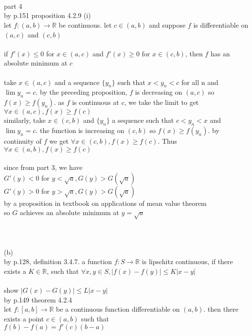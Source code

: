 \documentclass[12pt, border = 4pt, multi]{article} %
\begin{document}
\\
\\
\\
part 4\\
by p.151 proposition 4.2.9 (i)\\
let $f: (a, b) \rightarrow \mathbb{R}$ be continuous. let $c \in (a, b)$ and suppose $f$ is differentiable on $(a, c)$ and $(c, b)$\\
\\
if $f'(x) \leq 0$ for $x \in (a, c)$ and $f'(x) \geq 0$ for $x \in (c,b)$, then $f$ has an absolute minimum at $c$\\
\\
take $x \in (a, c)$ and a sequence
$\{y_n\}$ such that $x < y_n < c$ for all n and $\lim y_n = c$. by the preceding proposition, $f$ is decreasing on
$(a, c)$ so $f(x) \geq f(y_n)$. as $f$ is continuous at $c$, we take the limit to get $\forall x \in (a, c), f(x) \geq f(c)$\\
similarly, take $x \in (c, b)$ and $\{y_n\}$ a sequence such that $c < y_n < x$ and $\lim y_n = c$. the function
is increasing on $(c, b)$ so $f(x) \geq f(y_n)$. by continuity of $f$ we get $ \forall x \in (c, b), f(x) \geq f(c)$.
Thus $\forall x \in (a,b), f(x) \geq f(c)$\\
\\
since from part 3, we have\\
$G'(y) < 0$ for $y < \sqrt{a}, G(y) > G(\sqrt{a})$\\
$G'(y) > 0$ for $y > \sqrt{a}, G(y) > G(\sqrt{a})$\\
by a proposition in textbook on applications of mean value theorem\\
so $G$ achieves an absolute minimum at $y = \sqrt{a}$\\
\\
\\
\\
(b)\\
by p.128, definition 3.4.7. a function $f: S \rightarrow \mathbb{R}$ is lipschitz continuous, if there exists a $K \in \mathbb{R}$, such that
$\forall x, y \in S, |f(x) - f(y)| \leq K|x - y|$\\
\\
show $|G(x) - G(y)| \leq L|x - y|$\\
by p.149 theorem 4.2.4\\
let $f: [a, b] \rightarrow \mathbb{R}$ be a continuous function differentiable on
$(a, b)$. then there exists a point $c \in (a, b)$ such that\\
$f(b) - f(a) = f'(c)(b - a)$\\
\end{document}
